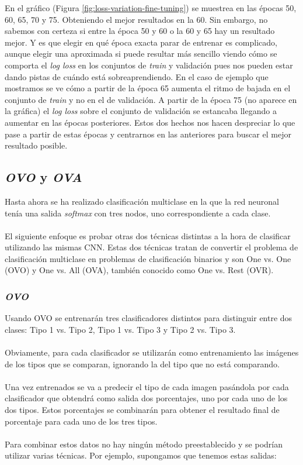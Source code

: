 En el gráfico (Figura \ref{fig:loss-variation-fine-tuning}) se muestrea en las épocas 50, 60, 65, 70 y 75. Obteniendo el mejor resultados en la 60. Sin embargo, no sabemos con certeza si entre la época 50 y 60 o la 60 y 65 hay un resultado mejor. Y es que elegir en qué época exacta parar de entrenar es complicado, aunque elegir una aproximada si puede resultar más sencillo viendo cómo se comporta el \textit{log loss} en los conjuntos de \textit{train} y validación pues nos pueden estar dando pistas de cuándo está sobreaprendiendo. En el caso de ejemplo que mostramos se ve cómo a partir de la época 65 aumenta el ritmo de bajada en el conjunto de \textit{train} y no en el de validación. A partir de la época 75 (no aparece en la gráfica) el \textit{log loss} sobre el conjunto de validación se estancaba llegando a aumentar en las épocas posteriores. Estos dos hechos nos hacen despreciar lo que pase a partir de estas épocas y centrarnos en las anteriores para buscar el mejor resultado posible.

\subsection{\textit{OVO} y \textit{OVA}}

Hasta ahora se ha realizado clasificación multiclase en la que la red neuronal tenía una salida \textit{softmax} con tres nodos, uno correspondiente a cada clase.
\\ \\
El siguiente enfoque es probar otras dos técnicas distintas a la hora de clasificar utilizando las mismas CNN. Estas dos técnicas tratan de convertir el problema de clasificación multiclase en problemas de clasificación binarios y son One vs. One (OVO) y One vs. All (OVA), también conocido como One vs. Rest (OVR).

\subsubsection{\textit{OVO}}

Usando OVO se entrenarán tres clasificadores distintos para distinguir entre dos clases: Tipo 1 vs. Tipo 2, Tipo 1 vs. Tipo 3 y Tipo 2 vs. Tipo 3.
\\ \\
Obviamente, para cada clasificador se utilizarán como entrenamiento las imágenes de los tipos que se comparan, ignorando la del tipo que no está comparando.
\\ \\
Una vez entrenados se va a predecir el tipo de cada imagen pasándola por cada clasificador que obtendrá como salida dos porcentajes, uno por cada uno de los dos tipos. Estos porcentajes se combinarán para obtener el resultado final de porcentaje para cada uno de los tres tipos.
\\ \\
Para combinar estos datos no hay ningún método preestablecido y se podrían utilizar varias técnicas. Por ejemplo, supongamos que tenemos estas salidas:

